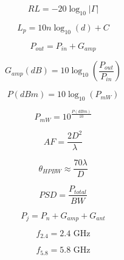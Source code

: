 \documentclass[12pt,a4paper]{report}
\begin{document}
	\begin{equation}
		RL=-20\log_{10}|\Gamma|
		\label{eq:return_loss}
	\end{equation}
	
	\begin{equation}
		L_p=10n\log_{10}(d)+C
		\label{eq:path_loss}
	\end{equation}
	
	\begin{equation}
		P_{out}=P_{in}+G_{amp}
		\label{eq:amplifier_gain}
	\end{equation}
	
	\begin{equation}
		G_{amp}(dB)=10\log_{10}\left(\frac{P_{out}}{P_{in}}\right)
		\label{eq:gain_db}
	\end{equation}
	
	\begin{equation}
		P(dBm)=10\log_{10}(P_{mW})
		\label{eq:dbm}
	\end{equation}
	
	\begin{equation}
		P_{mW}=10^{\frac{P(dBm)}{10}}
		\label{eq:milliwatt}
	\end{equation}
	
	\begin{equation}
		AF=\frac{2D^2}{\lambda}
		\label{eq:far_field}
	\end{equation}
	
	\begin{equation}
		\theta_{HPBW}\approx\frac{70\lambda}{D}
		\label{eq:hpbw}
	\end{equation}
	
	\begin{equation}
		PSD=\frac{P_{total}}{BW}
		\label{eq:psd}
	\end{equation}
	
	\begin{equation}
		P_j=P_n+G_{amp}+G_{ant}
		\label{eq:jamming_power}
	\end{equation}
	
	\begin{equation}
		f_{2.4}=2.4 \text{ GHz}
		\label{eq:24ghz}
	\end{equation}
	
	\begin{equation}
		f_{5.8}=5.8 \text{ GHz}
		\label{eq:58ghz}
	\end{equation}
	
	
	
	
	\newpage
	\setcounter{page}{18}
	
\end{document}
